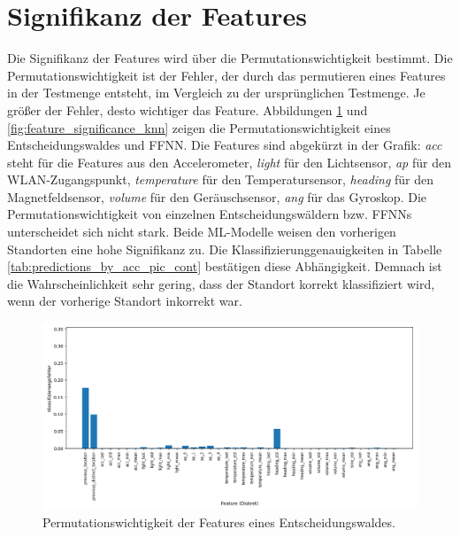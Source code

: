 \newpage
\section{Signifikanz der Features}
Die Signifikanz der Features wird über die Permutationswichtigkeit bestimmt.
Die Permutationswichtigkeit ist der Fehler, der durch das permutieren eines Features in der Testmenge entsteht, im Vergleich zu der ursprünglichen Testmenge.
Je größer der Fehler, desto wichtiger das Feature.
\newline
\newline
Abbildungen \ref{fig:feature_significance_dt} und \ref{fig:feature_significance_knn} zeigen die Permutationswichtigkeit eines Entscheidungswaldes und FFNN.
Die Features sind abgekürzt in der Grafik: \textit{acc} steht für die Features aus den Accelerometer, \textit{light} für den Lichtsensor, \textit{ap} für den WLAN-Zugangspunkt,
\textit{temperature} für den Temperatursensor, \textit{heading} für den Magnetfeldsensor, \textit{volume} für den Geräuschsensor, \textit{ang} für das Gyroskop.
Die Permutationswichtigkeit von einzelnen Entscheidungswäldern bzw. FFNNs unterscheidet sich nicht stark.
Beide ML-Modelle weisen den vorherigen Standorten eine hohe Signifikanz zu.
Die Klassifizierunggenauigkeiten in Tabelle \ref{tab:predictions_by_acc_pic_cont} bestätigen diese Abhängigkeit.
Demnach ist die Wahrscheinlichkeit sehr gering, dass der Standort korrekt klassifiziert wird, wenn der vorherige Standort inkorrekt war.
\begin{figure}[h!]
    \centering
    \includegraphics[width=\linewidth]{images/evaluation_feature_importance_dt_pi.png}
    \caption{Permutationswichtigkeit der Features eines Entscheidungswaldes.}
    \label{fig:feature_significance_dt}
\end{figure}
